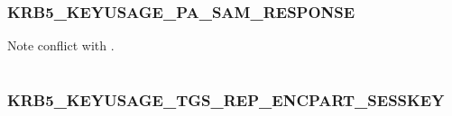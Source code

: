 \documentclass[letterpaper,10pt,english]{sphinxmanual}
\begin{document}
\subsubsection{KRB5\_KEYUSAGE\_PA\_SAM\_RESPONSE}
\label{appdev/refs/macros/KRB5_KEYUSAGE_PA_SAM_RESPONSE:krb5-keyusage-pa-sam-response-data}\label{appdev/refs/macros/KRB5_KEYUSAGE_PA_SAM_RESPONSE:krb5-keyusage-pa-sam-response}\label{appdev/refs/macros/KRB5_KEYUSAGE_PA_SAM_RESPONSE::doc}

\begin{fulllineitems}
\label{appdev/refs/macros/KRB5_KEYUSAGE_PA_SAM_RESPONSE:KRB5_KEYUSAGE_PA_SAM_RESPONSE}
\end{fulllineitems}


Note conflict with  .

\begin{tabulary}{\linewidth}{|L|L|}
\hline

 & 
\\\hline
\end{tabulary}



\subsubsection{KRB5\_KEYUSAGE\_TGS\_REP\_ENCPART\_SESSKEY}
\label{appdev/refs/macros/KRB5_KEYUSAGE_TGS_REP_ENCPART_SESSKEY:krb5-keyusage-tgs-rep-encpart-sesskey}\label{appdev/refs/macros/KRB5_KEYUSAGE_TGS_REP_ENCPART_SESSKEY:krb5-keyusage-tgs-rep-encpart-sesskey-data}\label{appdev/refs/macros/KRB5_KEYUSAGE_TGS_REP_ENCPART_SESSKEY::doc}

\begin{fulllineitems}
\label{appdev/refs/macros/KRB5_KEYUSAGE_TGS_REP_ENCPART_SESSKEY:KRB5_KEYUSAGE_TGS_REP_ENCPART_SESSKEY}
\end{fulllineitems}


\begin{tabulary}{\linewidth}{|L|L|}
\hline

 & 
\\\hline
\end{tabulary}
\end{document}
